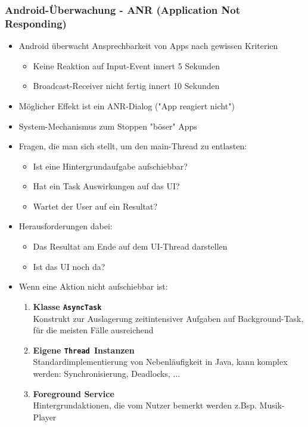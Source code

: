 \documentclass[a4paper]{article}
\begin{document}
		\subsubsection{Android-Überwachung - ANR (Application Not Responding)}
			\begin{itemize}
				\item Android überwacht Ansprechbarkeit von Apps nach gewissen Kriterien
					\begin{itemize}
						\item Keine Reaktion auf Input-Event innert 5 Sekunden
						\item Broadcast-Receiver nicht fertig innert 10 Sekunden
					\end{itemize}
				\item Möglicher Effekt ist ein ANR-Dialog ("App reagiert nicht")
				\item System-Mechanismus zum Stoppen "böser" Apps
				\item Fragen, die man sich stellt, um den main-Thread zu entlasten:
					\begin{itemize}
						\item Ist eine Hintergrundaufgabe aufschiebbar?
						\item Hat ein Task Auswirkungen auf das UI?
						\item Wartet der User auf ein Resultat?
					\end{itemize}
				\item Herausforderungen dabei:
					\begin{itemize}
						\item Das Resultat am Ende auf dem UI-Thread darstellen
						\item Ist das UI noch da?
					\end{itemize}
				\item Wenn eine Aktion nicht aufschiebbar ist:
					\begin{enumerate}
						\item \textbf{Klasse \texttt{AsyncTask}}\\
						Konstrukt zur Auslagerung zeitintensiver Aufgaben auf Background-Task, für die meisten Fälle ausreichend
						\item \textbf{Eigene \texttt{Thread }Instanzen}\\
						Standardimplementierung von Nebenläufigkeit in Java, kann komplex werden: Synchronisierung, Deadlocks, ...
						\item \textbf{Foreground Service}\\
						Hintergrundaktionen, die vom Nutzer bemerkt werden z.Bsp. Musik-Player

\end{enumerate}
\end{itemize}
\end{document}
